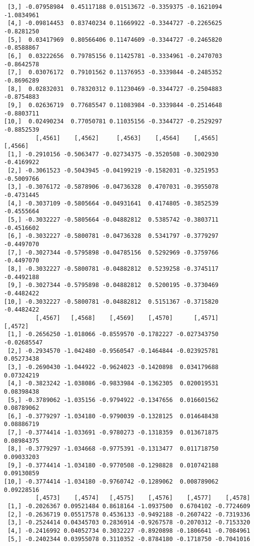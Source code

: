 \documentclass[
  letterpaper,
  DIV=11,
  numbers=noendperiod]{scrreprt}
\begin{document}
\begin{verbatim}
 [3,] -0.07958984  0.45117188 0.01513672 -0.3359375 -0.1621094 -1.0834961
 [4,] -0.09814453  0.83740234 0.11669922 -0.3344727 -0.2265625 -0.8281250
 [5,]  0.03417969  0.80566406 0.11474609 -0.3344727 -0.2465820 -0.8588867
 [6,]  0.03222656  0.79785156 0.11425781 -0.3334961 -0.2470703 -0.8642578
 [7,]  0.03076172  0.79101562 0.11376953 -0.3339844 -0.2485352 -0.8696289
 [8,]  0.02832031  0.78320312 0.11230469 -0.3344727 -0.2504883 -0.8754883
 [9,]  0.02636719  0.77685547 0.11083984 -0.3339844 -0.2514648 -0.8803711
[10,]  0.02490234  0.77050781 0.11035156 -0.3344727 -0.2529297 -0.8852539
         [,4561]    [,4562]     [,4563]    [,4564]    [,4565]    [,4566]
 [1,] -0.2910156 -0.5063477 -0.02734375 -0.3520508 -0.3002930 -0.4169922
 [2,] -0.3061523 -0.5043945 -0.04199219 -0.1582031 -0.3251953 -0.5009766
 [3,] -0.3076172 -0.5878906 -0.04736328  0.4707031 -0.3955078 -0.4731445
 [4,] -0.3037109 -0.5805664 -0.04931641  0.4174805 -0.3852539 -0.4555664
 [5,] -0.3032227 -0.5805664 -0.04882812  0.5385742 -0.3803711 -0.4516602
 [6,] -0.3032227 -0.5800781 -0.04736328  0.5341797 -0.3779297 -0.4497070
 [7,] -0.3027344 -0.5795898 -0.04785156  0.5292969 -0.3759766 -0.4497070
 [8,] -0.3032227 -0.5800781 -0.04882812  0.5239258 -0.3745117 -0.4492188
 [9,] -0.3027344 -0.5795898 -0.04882812  0.5200195 -0.3730469 -0.4482422
[10,] -0.3032227 -0.5800781 -0.04882812  0.5151367 -0.3715820 -0.4482422
         [,4567]   [,4568]    [,4569]    [,4570]      [,4571]     [,4572]
 [1,] -0.2656250 -1.018066 -0.8559570 -0.1782227 -0.027343750 -0.02685547
 [2,] -0.2934570 -1.042480 -0.9560547 -0.1464844 -0.023925781  0.05273438
 [3,] -0.2690430 -1.044922 -0.9624023 -0.1420898  0.034179688  0.07324219
 [4,] -0.3823242 -1.038086 -0.9833984 -0.1362305  0.020019531  0.08398438
 [5,] -0.3789062 -1.035156 -0.9794922 -0.1347656  0.016601562  0.08789062
 [6,] -0.3779297 -1.034180 -0.9790039 -0.1328125  0.014648438  0.08886719
 [7,] -0.3774414 -1.033691 -0.9780273 -0.1318359  0.013671875  0.08984375
 [8,] -0.3779297 -1.034668 -0.9775391 -0.1313477  0.011718750  0.09033203
 [9,] -0.3774414 -1.034180 -0.9770508 -0.1298828  0.010742188  0.09130859
[10,] -0.3774414 -1.034180 -0.9760742 -0.1289062  0.008789062  0.09228516
         [,4573]    [,4574]   [,4575]    [,4576]    [,4577]    [,4578]
 [1,] -0.2026367 0.09521484 0.8618164 -1.0937500  0.6704102 -0.7724609
 [2,] -0.2636719 0.05517578 0.4536133 -0.9492188 -0.2607422 -0.7319336
 [3,] -0.2524414 0.04345703 0.2836914 -0.9267578 -0.2070312 -0.7153320
 [4,] -0.2416992 0.04052734 0.3032227 -0.8920898 -0.1806641 -0.7084961
 [5,] -0.2402344 0.03955078 0.3110352 -0.8784180 -0.1718750 -0.7041016

\end{verbatim}
\end{document}
